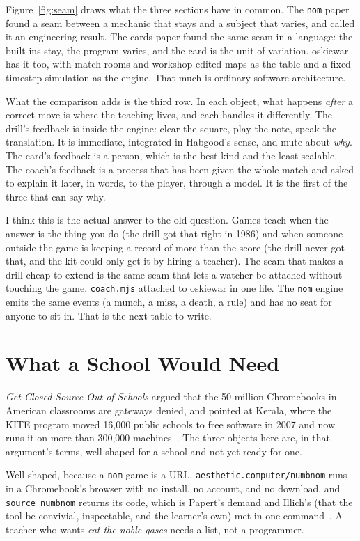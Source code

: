 \documentclass[10pt,letterpaper,twocolumn]{article}
\newcommand{\code}[1]{\texttt{#1}}
\begin{document}
Figure~\ref{fig:seam} draws what the three sections have in common. The \code{nom} paper found a seam between a mechanic that stays and a subject that varies, and called it an engineering result. The cards paper found the same seam in a language: the built-ins stay, the program varies, and the card is the unit of variation. oskiewar has it too, with match rooms and workshop-edited maps as the table and a fixed-timestep simulation as the engine. That much is ordinary software architecture.

What the comparison adds is the third row. In each object, what happens \emph{after} a correct move is where the teaching lives, and each handles it differently. The drill's feedback is inside the engine: clear the square, play the note, speak the translation. It is immediate, integrated in Habgood's sense, and mute about \emph{why}. The card's feedback is a person, which is the best kind and the least scalable. The coach's feedback is a process that has been given the whole match and asked to explain it later, in words, to the player, through a model. It is the first of the three that can say why.

I think this is the actual answer to the old question. Games teach when the answer is the thing you do (the drill got that right in 1986) and when someone outside the game is keeping a record of more than the score (the drill never got that, and the kit could only get it by hiring a teacher). The seam that makes a drill cheap to extend is the same seam that lets a watcher be attached without touching the game. \code{coach.mjs} attached to oskiewar in one file. The \code{nom} engine emits the same events (a munch, a miss, a death, a rule) and has no seat for anyone to sit in. That is the next table to write.

\section{What a School Would Need}
\label{sec:school}

\emph{Get Closed Source Out of Schools} argued that the 50 million Chromebooks in American classrooms are gateways denied, and pointed at Kerala, where the KITE program moved 16,000 public schools to free software in 2007 and now runs it on more than 300,000 machines~\citep{scudder2026openschools,kite2024gnulinux}. The three objects here are, in that argument's terms, well shaped for a school and not yet ready for one.

Well shaped, because a \code{nom} game is a URL. \code{aesthetic.computer/numbnom} runs in a Chromebook's browser with no install, no account, and no download, and \code{source numbnom} returns its code, which is Papert's demand and Illich's (that the tool be convivial, inspectable, and the learner's own) met in one command~\citep{illich1971deschooling,scudder2026pieces}. A teacher who wants \emph{eat the noble gases} needs a list, not a programmer.
\end{document}
